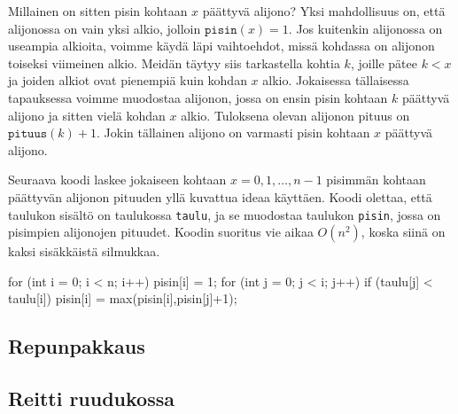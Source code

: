 Millainen on sitten pisin kohtaan $x$ päättyvä alijono?
Yksi mahdollisuus on, että alijonossa on vain yksi alkio,
jolloin $\texttt{pisin}(x)=1$.
Jos kuitenkin alijonossa on useampia alkioita,
voimme käydä läpi vaihtoehdot, missä kohdassa on alijonon
toiseksi viimeinen alkio.
Meidän täytyy siis tarkastella kohtia $k$, joille pätee $k<x$
ja joiden alkiot ovat pienempiä kuin kohdan $x$ alkio.
Jokaisessa tällaisessa tapauksessa voimme muodostaa alijonon,
jossa on ensin pisin kohtaan $k$ päättyvä alijono ja
sitten vielä kohdan $x$ alkio.
Tuloksena olevan alijonon pituus on $\texttt{pituus}(k)+1$.
Jokin tällainen alijono on varmasti pisin kohtaan $x$ päättyvä alijono.

Seuraava koodi laskee jokaiseen kohtaan $x=0,1,\dots,n-1$
pisimmän kohtaan päättyvän alijonon pituuden yllä kuvattua
ideaa käyttäen.
Koodi olettaa, että taulukon sisältö on taulukossa \texttt{taulu},
ja se muodostaa taulukon \texttt{pisin}, jossa on pisimpien
alijonojen pituudet.
Koodin suoritus vie aikaa $O(n^2)$, koska siinä on kaksi sisäkkäistä silmukkaa.

\begin{code}
for (int i = 0; i < n; i++) {
    pisin[i] = 1;
    for (int j = 0; j < i; j++) {
        if (taulu[j] < taulu[i]) {
            pisin[i] = max(pisin[i],pisin[j]+1);
        }
    }
}
\end{code}

\subsection{Repunpakkaus}

\subsection{Reitti ruudukossa}
